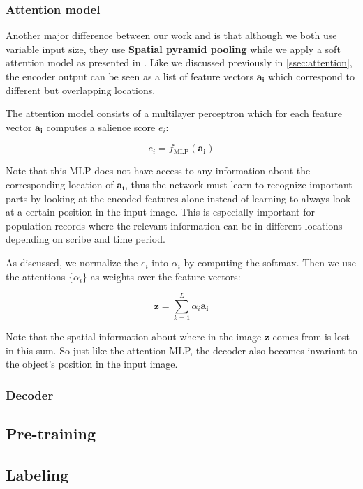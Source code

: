 \subsubsection{Attention model}

Another major difference between our work and \cite{FornesCnnCategorization} is that although we both use variable input size, they use \textbf{Spatial pyramid pooling} while we apply a soft attention model as presented in \cite{AttendAndTell}. Like we discussed previously in \ref{ssec:attention}, the encoder output can be seen as a list of feature vectors $\mathbf{a_i}$ which correspond to different but overlapping locations.

The attention model consists of a multilayer perceptron which for each feature vector $\mathbf{a_i}$ computes a salience score $e_i$:

\[
e_i = f_\text{MLP}(\mathbf{a_i})
\]

Note that this MLP does not have access to any information about the corresponding location of $\mathbf{a_i}$, thus the network must learn to recognize important parts by looking at the encoded features alone instead of learning to always look at a certain position in the input image. This is especially important for population records where the relevant information can be in different locations depending on scribe and time period.

As discussed, we normalize the $e_i$ into $\alpha_i$ by computing the softmax. Then we use the attentions $\{\alpha_i\}$ as weights over the feature vectors:

\[
\mathbf{z} = \sum_{k=1}^L \alpha_i \mathbf{a_i}
\]

Note that the spatial information about where in the image $\mathbf{z}$ comes from is lost in this sum. So just like the attention MLP, the decoder also becomes invariant to the object's position in the input image.

\subsubsection{Decoder}



\subsection{Pre-training}
\subsection{Labeling}
